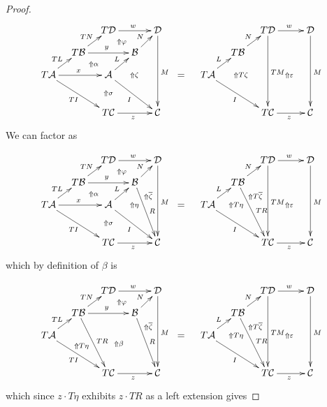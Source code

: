 \documentclass[a4paper,oneside,english]{amsart}
\numberwithin{equation}{section}
\numberwithin{figure}{section}
\theoremstyle{plain}
\theoremstyle{definition}
\theoremstyle{remark}
\theoremstyle{definition}
\theoremstyle{plain}
\theoremstyle{plain}
\theoremstyle{plain}
\begin{document}
\begin{proof}
\[
\xymatrix@=1em{ &  & T\mathcal{D}\ar[rr]^{w}\ar@{}[rd]|-{\Uparrow\varphi} &  & \mathcal{D}\ar[dddd]^{M} &  &  &  & T\mathcal{D}\ar[dddd]^{TM}\ar[rr]^{w} &  & \mathcal{D}\ar[dddd]^{M}\\
 & T\mathcal{B}\ar[rr]^{y}\ar[ru]^{TN}\ar@{}[rd]|-{\Uparrow\alpha} &  & \mathcal{B}\ar[ur]^{N} &  &  &  & T\mathcal{B}\ar[ur]^{N}\\
T\mathcal{A}\ar[rr]^{x}\ar[rdrd]_{TI}\ar[ru]^{TL} &  & \mathcal{A}\ar[rdrd]_{I}\ar[ur]^{L}\ar@{}[dd]|-{\Uparrow\sigma}\ar@{}[rr]|-{\Uparrow\zeta} &  & \; & = & T\mathcal{A}\ar[rdrd]_{I}\ar[ur]^{L}\ar@{}[rr]|-{\Uparrow T\zeta} &  & \;\ar@{}[rr]|-{\Uparrow{\varepsilon}} &  & \;\\
\\
 &  & T\mathcal{C}\ar[rr]_{z} &  & \mathcal{C} &  &  &  & T\mathcal{C}\ar[rr]_{z} &  & \mathcal{C}
}
\]
We can factor as 

\[
\xymatrix@=1em{ &  & T\mathcal{D}\ar[rr]^{w}\ar@{}[rd]|-{\Uparrow\varphi} &  & \mathcal{D}\ar[dddd]^{M} &  &  &  & T\mathcal{D}\ar[dddd]^{TM}\ar[rr]^{w} &  & \mathcal{D}\ar[dddd]^{M}\\
 & T\mathcal{B}\ar[rr]^{y}\ar[ru]^{TN}\ar@{}[rd]|-{\Uparrow\alpha} &  & \mathcal{B}\ar[ur]^{N}\ar[rddd]^{R}\ar@{}[rd]|-{\Uparrow\overline{\zeta}} &  &  &  & T\mathcal{B}\ar[ur]^{N}\ar[rddd]^{TR}\ar@{}[rd]|-{\Uparrow T\overline{\zeta}}\\
T\mathcal{A}\ar[rr]^{x}\ar[rdrd]_{TI}\ar[ru]^{TL} &  & \mathcal{A}\ar[rdrd]_{I}\ar[ur]^{L}\ar@{}[dd]|-{\Uparrow\sigma}\ar@{}[rr]|-{\Uparrow\eta} &  & \; & = & T\mathcal{A}\ar[rdrd]_{I}\ar[ur]^{L}\ar@{}[rr]|-{\Uparrow T\eta\quad} &  & \;\ar@{}[rr]|-{\Uparrow{\varepsilon}} &  & \;\\
\\
 &  & T\mathcal{C}\ar[rr]_{z} &  & \mathcal{C} &  &  &  & T\mathcal{C}\ar[rr]_{z} &  & \mathcal{C}
}
\]
which by definition of $\beta$ is 

\[
\xymatrix@=1em{ &  & T\mathcal{D}\ar[rr]^{w}\ar@{}[rd]|-{\Uparrow\varphi} &  & \mathcal{D}\ar[dddd]^{M} &  &  &  & T\mathcal{D}\ar[dddd]^{TM}\ar[rr]^{w} &  & \mathcal{D}\ar[dddd]^{M}\\
 & T\mathcal{B}\ar[rr]^{y}\ar[ru]^{TN}\ar[rddd]^{TR}\ar@{}[rdddrr]|-{\Uparrow\beta} &  & \mathcal{B}\ar[ur]^{N}\ar[rddd]^{R}\ar@{}[rd]|-{\Uparrow\overline{\zeta}} &  &  &  & T\mathcal{B}\ar[ur]^{N}\ar[rddd]^{TR}\ar@{}[rd]|-{\Uparrow T\overline{\zeta}}\\
T\mathcal{A}\ar[rdrd]_{TI}\ar[ru]^{TL}\ar@{}[rdr]|-{\Uparrow T\eta} &  &  &  & \; & = & T\mathcal{A}\ar[rdrd]_{I}\ar[ur]^{L}\ar@{}[rr]|-{\Uparrow T\eta\quad} &  & \;\ar@{}[rr]|-{\Uparrow{\varepsilon}} &  & \;\\
 &  & \;\\
 &  & T\mathcal{C}\ar[rr]_{z} &  & \mathcal{C} &  &  &  & T\mathcal{C}\ar[rr]_{z} &  & \mathcal{C}
}
\]
which since $z\cdot T\eta$ exhibits $z\cdot TR$ as a left extension
gives 


\end{proof}
\end{document}
